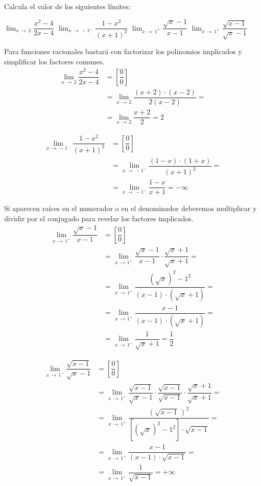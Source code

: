 \begin{ejemplo}{
Calcula el valor de los siguientes límites:
\begin{apartadosc}
 \ap $\displaystyle{\lim_{x\,\to\,2}\dfrac{x^2-4}{2x-4}}$
 \ap $\displaystyle{\lim_{x\,\to\,-1^-}\dfrac{1-x^2}{(x+1)^2}}$
 \ap $\displaystyle{\lim_{x\,\to\,1^+}\dfrac{\sqrt{x}-1}{x-1}}$
 \ap $\displaystyle{\lim_{x\,\to\,1^+}\dfrac{\sqrt{x-1}}{\sqrt{x}-1}}$
\end{apartadosc}
}

Para funciones racionales bastará con factorizar los polinomios implicados y simplificar los factores comunes.
\[\begin{aligned}
    \lim_{x\,\to\,2}\dfrac{x^2-4}{2x-4}&=\left[\dfrac00\right]\\
        &=\lim_{x\,\to\,2}\dfrac{(x+2)\cdot(x-2)}{2(x-2)}=\\
        &=\lim_{x\,\to\,2}\dfrac{x+2}{2}=2
\end{aligned}\]

\[\begin{aligned}
    \lim_{x\,\to\,-1^-}\dfrac{1-x^2}{(x+1)^2}&=\left[\dfrac00\right]\\
        &=\lim_{x\,\to\,-1^-}\dfrac{(1-x)\cdot(1+x)}{(x+1)^2}=\\
        &=\lim_{x\,\to\,-1^-}\dfrac{1-x}{x+1}=-\infty
\end{aligned}\]

Si aparecen raíces en el numerador o en el denominador deberemos multiplicar y dividir por el conjugado para revelar los factores implicados.
\[\begin{aligned}
    \lim_{x\,\to\,1^+}\dfrac{\sqrt{x}-1}{x-1}&=\left[\dfrac00\right]\\
        &=\lim_{x\,\to\,1^+}\dfrac{\sqrt{x}-1}{x-1}\cdot\dfrac{\sqrt{x}+1}{\sqrt{x}+1}=\\
        &=\lim_{x\,\to\,1^+}\dfrac{\left(\sqrt{x}\right)^2-1^2}{(x-1)\cdot\left(\sqrt{x}+1\right)}=\\
        &=\lim_{x\,\to\,1^+}\dfrac{x-1}{(x-1)\cdot\left(\sqrt{x}+1\right)}=\\
        &=\lim_{x\,\to\,1^+}\dfrac{1}{\sqrt{x}+1}=\dfrac12
\end{aligned}\]

\[\begin{aligned}
    \lim_{x\,\to\,1^+}\dfrac{\sqrt{x-1}}{\sqrt{x}-1}&=\left[\dfrac00\right]\\
        &=\lim_{x\,\to\,1^+}\dfrac{\sqrt{x-1}}{\sqrt{x}-1}
            \cdot\dfrac{\sqrt{x-1}}{\sqrt{x-1}}
                \cdot\dfrac{\sqrt{x}+1}{\sqrt{x}+1}=\\
        &=\lim_{x\,\to\,1^+}\dfrac{\left(\sqrt{x-1}\,\right)^2}{\left[\left(\sqrt{x}\right)^2-1^2
        \right]\cdot\sqrt{x-1}}=\\
        &=\lim_{x\,\to\,1^+}\dfrac{x-1}{(x-1)\cdot\sqrt{x-1}}=\\
        &=\lim_{x\,\to\,1^+}\dfrac{1}{\sqrt{x-1}}=+\infty
\end{aligned}\]
\end{ejemplo}

